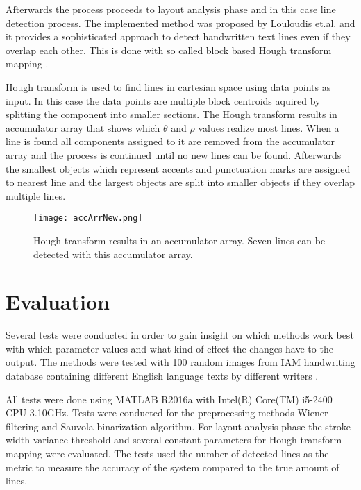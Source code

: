\documentclass{article}
\begin{document}
\begin{multicols}{2}
        Afterwards the process proceeds to layout analysis phase and in this case line detection process. The implemented method was proposed by Louloudis et.al. and it provides a sophisticated approach to detect handwritten text lines even if they overlap each other. This is done with so called block based Hough transform mapping \cite{Louloudis2} .


        Hough transform is used to find lines in cartesian space using data points as input. In this case the data points are multiple block centroids aquired by splitting the component into smaller sections. The Hough transform results in accumulator array that shows which $\theta$ and $\rho$ values realize most lines. When a line is found all components assigned to it are removed from the accumulator array and the process is continued until no new lines can be found. Afterwards the smallest objects which represent accents and punctuation marks are assigned to nearest line and the largest objects are split into smaller objects if they overlap multiple lines.

        \begin{figure}[H]
          \centering
          \texttt{[image: accArrNew.png]}
          \caption{Hough transform results in an accumulator array. Seven lines can be detected with this accumulator array.\label{fig:houghacc2}}
        \end{figure}

        \section*{Evaluation}
          Several tests were conducted in order to gain insight on which methods work best with which parameter values and what kind of effect the changes have to the output. The methods were tested with 100 random images from IAM handwriting database containing different English language texts by different writers \cite{IAM}.

          All tests were done using MATLAB R2016a with Intel(R) Core(TM) i5-2400 CPU 3.10GHz. Tests were conducted for the preprocessing methods Wiener filtering and Sauvola binarization algorithm. For layout analysis phase the stroke width variance threshold and several constant parameters for Hough transform mapping were evaluated. The tests used the number of detected lines as the metric to measure the accuracy of the system compared to the true amount of lines.


\end{multicols}
\end{document}
